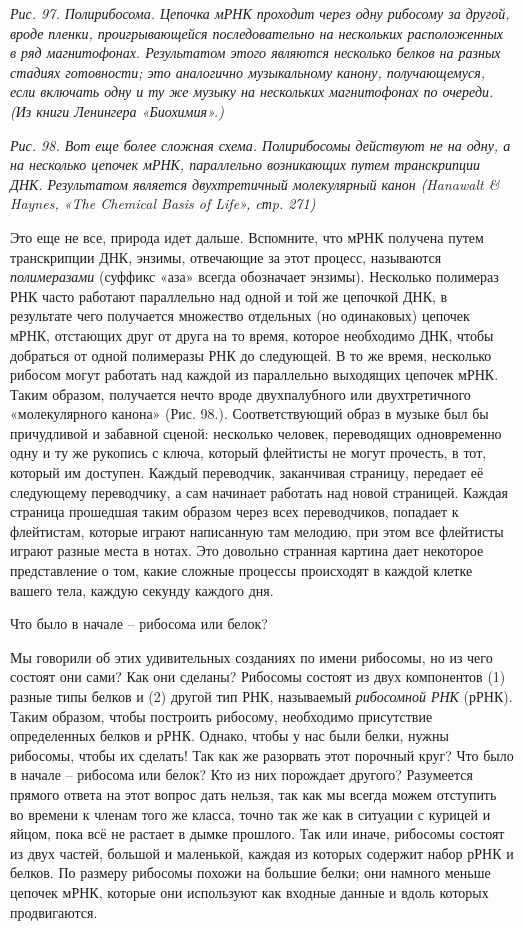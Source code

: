 \documentclass[../main.tex]{subfiles}
\begin{document}
\emph{Рис. 97. Полирибосома. Цепочка мРНК проходит через одну рибосому за другой, вроде пленки, проигрывающейся последовательно на нескольких расположенных в ряд магнитофонах. Результатом этого являются несколько белков на разных стадиях готовности; это аналогично музыкальному канону, получающемуся, если включать одну и ту же музыку на нескольких магнитофонах по очереди. (Из книги Ленингера «Биохимия».)}

\emph{Рис. 98. Вот еще более сложная схема. Полирибосомы действуют не на одну, а на несколько цепочек мРНК, параллельно возникающих путем транскрипции ДНК\@. Результатом является двухтретичный молекулярный канон (Hanawalt \& Haynes, «The Chemical Basis of Life», cтp. 271)}

Это еще не все, природа идет дальше. Вспомните, что мРНК получена путем транскрипции ДНК, энзимы, отвечающие за этот процесс, называются \emph{полимеразами} (суффикс «аза» всегда обозначает энзимы). Несколько полимераз РНК часто работают параллельно над одной и той же цепочкой ДНК, в результате чего получается множество отдельных (но одинаковых) цепочек мРНК, отстающих друг от друга на то время, которое необходимо ДНК, чтобы добраться от одной полимеразы РНК до следующей. В то же время, несколько рибосом могут работать над каждой из параллельно выходящих цепочек мРНК\@. Таким образом, получается нечто вроде двухпалубного или двухтретичного «молекулярного канона» (Рис. 98.). Соответствующий образ в музыке был бы причудливой и забавной сценой: несколько человек, переводящих одновременно одну и ту же рукопись с ключа, который флейтисты не могут прочесть, в тот, который им доступен. Каждый переводчик, заканчивая страницу, передает её следующему переводчику, а сам начинает работать над новой страницей. Каждая страница прошедшая таким образом через всех переводчиков, попадает к флейтистам, которые играют написанную там мелодию, при этом все флейтисты играют разные места в нотах. Это довольно странная картина дает некоторое представление о том, какие сложные процессы происходят в каждой клетке вашего тела, каждую секунду каждого дня.

Что было в начале \--- рибосома или белок?

Мы говорили об этих удивительных созданиях по имени рибосомы, но из чего состоят они сами? Как они сделаны? Рибосомы состоят из двух компонентов (1) разные типы белков и (2) другой тип РНК, называемый \emph{рибосомной РНК} (рРНК). Таким образом, чтобы построить рибосому, необходимо присутствие определенных белков и рРНК\@. Однако, чтобы у нас были белки, нужны рибосомы, чтобы их сделать! Так как же разорвать этот порочный круг? Что было в начале \--- рибосома или белок? Кто из них порождает другого? Разумеется прямого ответа на этот вопрос дать нельзя, так как мы всегда можем отступить во времени к членам того же класса, точно так же как в ситуации с курицей и яйцом, пока всё не растает в дымке прошлого. Так или иначе, рибосомы состоят из двух частей, большой и маленькой, каждая из которых содержит набор рРНК и белков. По размеру рибосомы похожи на большие белки; они намного меньше цепочек мРНК, которые они используют как входные данные и вдоль которых продвигаются.
\end{document}
